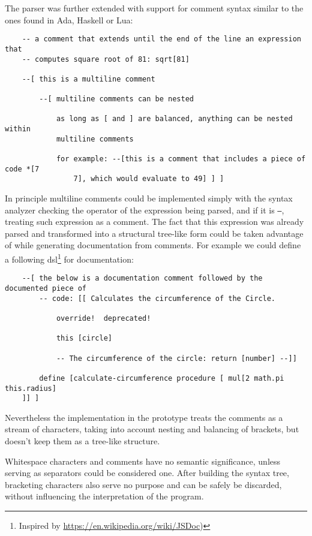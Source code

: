 The parser was further extended with support for comment syntax similar to the
ones found in Ada, Haskell or Lua:
\begin{lstlisting}
    -- a comment that extends until the end of the line an expression that
    -- computes square root of 81: sqrt[81]
    
    --[ this is a multiline comment
        
        --[ multiline comments can be nested
            
            as long as [ and ] are balanced, anything can be nested within
            multiline comments
            
            for example: --[this is a comment that includes a piece of code *[7
                7], which would evaluate to 49] ] ]
\end{lstlisting}

In principle multiline comments could be implemented simply with the syntax
analyzer checking the operator of the expression being parsed, and if it is
\texttt{--}, treating such expression as a comment. The fact that this
expression was already parsed and transformed into a structural tree-like form
could be taken advantage of while generating documentation from comments. For
example we could define a following \acrlong{dsl}\footnote{Inspired by
  \url{https://en.wikipedia.org/wiki/JSDoc})} for documentation:
\begin{lstlisting}
    --[ the below is a documentation comment followed by the documented piece of
        -- code: [[ Calculates the circumference of the Circle.
            
            override!  deprecated!
            
            this [circle]
            
            -- The circumference of the circle: return [number] --]]
        
        define [calculate-circumference procedure [ mul[2 math.pi this.radius]
    ]] ]
\end{lstlisting}

Nevertheless the implementation in the prototype treats the comments as a stream
of characters, taking into account nesting and balancing of brackets, but
doesn't keep them as a tree-like structure.

Whitespace characters and comments have no semantic significance, unless serving
as separators could be considered one. After building the syntax tree,
bracketing characters also serve no purpose and can be safely be discarded,
without influencing the interpretation of the program.


